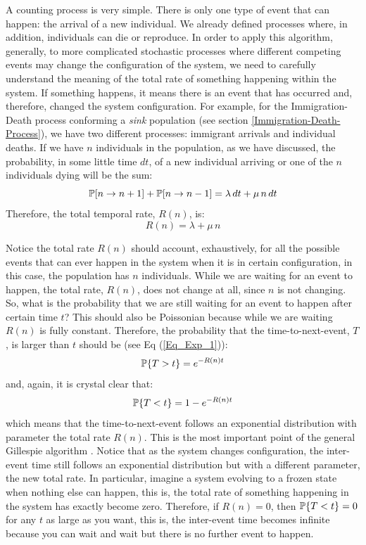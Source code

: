 A counting process is very simple. There is only one type of event that can happen: the arrival of a new individual. We already defined processes where, in addition, individuals can die or reproduce. In order to apply this algorithm, generally, to more complicated stochastic processes where different competing events may change the configuration of the system, we need to carefully understand the meaning of the total rate of something happening within the system. If something happens, it means there is an event that has occurred and, therefore, changed the system configuration. For example, for the Immigration-Death process conforming a \textit{sink} population (see section \ref{Immigration-Death-Process}), we have two different processes: immigrant arrivals and individual deaths. If we have $n$ individuals in the population, as we have discussed, the probability, in some little time $dt$, of a new individual arriving or one of the $n$ individuals dying will be the sum:
\begin{equation} 
{\mathbb P}[n \rightarrow n+1] + {\mathbb P}[n \rightarrow n-1] = \lambda\,dt + \mu \, n \,dt
\end{equation}
Therefore, the total temporal rate, $R(n)$, is:
\begin{equation} 
R(n) = \lambda + \mu \, n
\end{equation}
\smallskip

Notice the total rate $R(n)$ should account, exhaustively, for all the possible events that can ever happen in the system when it is in certain configuration, in this case, the population has $n$ individuals. While we are waiting for an event to happen, the total rate, $R(n)$, does not change at all, since $n$ is not changing. So, what is the probability that we are still waiting for an event to happen after certain time $t$? This should also be Poissonian because while we are waiting $R(n)$ is fully constant. Therefore, the probability that the time-to-next-event, $T$, is larger than $t$ should be (see Eq (\ref{Eq_Exp_1})):
\begin{equation}
{\mathbb P}\{T>t\} =  e^{-R(n) t}
\end{equation}
and, again, it is crystal clear that:
\begin{equation}
{\mathbb P}\{T<t\} =  1 - e^{-R(n) t}
\end{equation}
which means that the time-to-next-event follows an exponential distribution with parameter the total rate $R(n)$. This is the most important point of the general Gillespie algorithm \citep{Gillespie76}. Notice that as the system changes configuration, the inter-event time still follows an exponential distribution but with a different parameter, the new total rate. In particular, imagine a system evolving to a frozen state when nothing else can happen, this is, the total rate of something happening in the system has exactly become zero. Therefore, if $R(n) = 0$, then ${\mathbb P}\{T<t\} = 0$ for any $t$ as large as you want, this is, the inter-event time becomes infinite because you can wait and wait but there is no further event to happen.  
\smallskip

